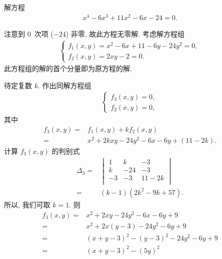 \begin{example}
    解方程
    \begin{align*}
        x^4 - 6x^3 + 11x^2 - 6x - 24 = 0.
    \end{align*}

    注意到 \(0\)~次项 (\(-24\)) 非零,
    故此方程无零解.
    考虑解方程组
    \begin{align*}
        \begin{cases}
            f_1 (x, y) = x^2 - 6x + 11 - 6y - 24y^2 = 0, \\
            f_2 (x, y) = 2xy - 2 = 0.
        \end{cases}
    \end{align*}
    此方程组的解的首个分量即为原方程的解.

    待定复数 \(k\).
    作出同解方程组
    \begin{align*}
        \begin{cases}
            f_3 (x, y) = 0, \\
            f_2 (x, y) = 0,
        \end{cases}
    \end{align*}
    其中
    \begin{align*}
        f_3 (x, y)
        = {} & f_1 (x, y) + kf_2 (x, y)                  \\
        = {} & x^2 + 2kxy - 24y^2 - 6x - 6y + (11 - 2k).
    \end{align*}
    计算 \(f_3 (x, y)\) 的判别式
    \begin{align*}
        \Delta_3
        = {} & \begin{vmatrix}
                   1  & k   & -3    \\
                   k  & -24 & -3    \\
                   -3 & -3  & 11-2k \\
               \end{vmatrix}        \\
        = {} & (k-1) (2k^2 - 9k + 57).
    \end{align*}
    所以, 我们可取 \(k = 1\).
    则
    \begin{align*}
        f_3 (x, y)
        = {} & x^2 + 2xy - 24y^2 - 6x - 6y + 9          \\
        = {} & x^2 + 2x(y-3) - 24y^2 - 6y + 9           \\
        = {} & (x + y - 3)^2 - (y-3)^2 - 24y^2 - 6y + 9 \\
        = {} & (x + y - 3)^2 - (5y)^2                   \\

\end{align*}
\end{example}
